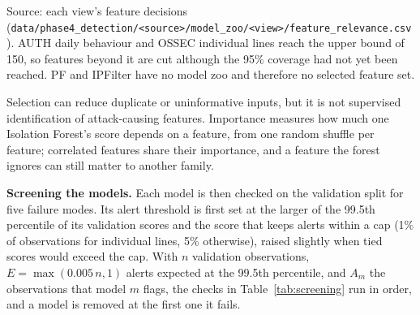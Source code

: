 \documentclass[11pt,a4paper]{article}
\newcommand{\projectref}[2]{#1 {\footnotesize(\nolinkurl{#2})}}
\begin{document}
Source: each view's \projectref{feature decisions}{data/phase4_detection/<source>/model_zoo/<view>/feature_relevance.csv}. AUTH daily behaviour and OSSEC individual lines reach the upper bound of 150, so features beyond it are cut although the 95\% coverage had not yet been reached. PF and IPFilter have no model zoo and therefore no selected feature set.

Selection can reduce duplicate or uninformative inputs, but it is not supervised identification of attack-causing features. Importance measures how much one Isolation Forest's score depends on a feature, from one random shuffle per feature; correlated features share their importance, and a feature the forest ignores can still matter to another family.

\textbf{Screening the models.} Each model is then checked on the validation split for five failure modes. Its alert threshold is first set at the larger of the 99.5th percentile of its validation scores and the score that keeps alerts within a cap (1\% of observations for individual lines, 5\% otherwise), raised slightly when tied scores would exceed the cap. With \(n\) validation observations, \(E=\max(0.005\,n,1)\) alerts expected at the 99.5th percentile, and \(A_m\) the observations that model \(m\) flags, the checks in Table~\ref{tab:screening} run in order, and a model is removed at the first one it fails.
\end{document}
